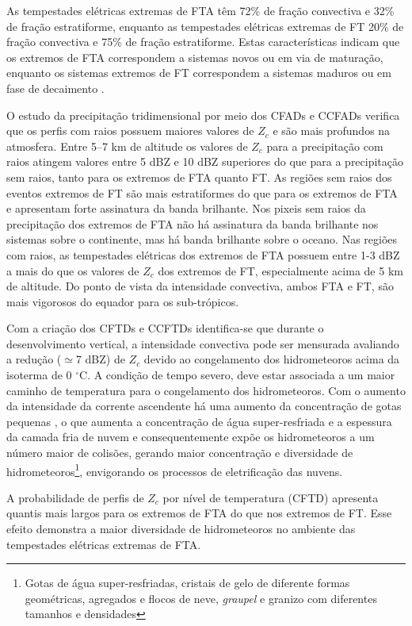 As tempestades elétricas extremas de FTA têm 72\% de fração convectiva e 32\% de fração estratiforme, enquanto as tempestades elétricas extremas de FT 20\% de fração convectiva e 75\% de fração estratiforme. Estas características indicam que os extremos de FTA correspondem a sistemas novos ou em via de maturação, enquanto os sistemas extremos de FT correspondem a sistemas maduros ou em fase de decaimento \cite{learyHouse1979}. 

O estudo da precipitação tridimensional por meio dos CFADs e CCFADs verifica que os perfis com raios possuem maiores valores de  $Z_c$ e são mais profundos na atmosfera. Entre 5--7 km de altitude os valores de $Z_c$ para a precipitação com raios atingem valores entre 5 dBZ e 10 dBZ superiores do que para a precipitação sem raios, tanto para os extremos de FTA quanto FT. As regiões sem raios dos eventos extremos de FT são mais estratiformes do que para os extremos de FTA e apresentam forte assinatura da banda brilhante. Nos pixeis sem raios da precipitação dos extremos de FTA não há assinatura da banda brilhante nos sistemas sobre o continente, mas há banda brilhante sobre o oceano. Nas regiões com raios, as tempestades elétricas dos extremos de FTA possuem entre 1-3 dBZ a mais do que os valores de $Z_c$ dos extremos de FT, especialmente acima de 5 km de altitude. Do ponto de vista da intensidade convectiva, ambos FTA e FT, são mais vigorosos do equador para os sub-trópicos. 


Com a criação dos CFTDs e CCFTDs identifica-se que durante o desenvolvimento vertical, a intensidade convectiva pode ser mensurada avaliando a redução ($\simeq$7 dBZ) de $Z_c$ devido ao congelamento dos hidrometeoros acima da isoterma de 0 $^{\circ}$C. A condição de tempo severo, deve estar associada a um maior caminho de temperatura para o congelamento dos hidrometeoros. Com o aumento da intensidade da corrente ascendente há uma aumento da  concentração de gotas pequenas \cite{bigg1953}, o que aumenta a concentração de água super-resfriada e a espessura da camada fria de nuvem e consequentemente expõe os hidrometeoros a um número maior de colisões, gerando maior concentração e diversidade de hidrometeoros\footnote{Gotas de água super-resfriadas, cristais de gelo de diferente formas geométricas, agregados e flocos de neve, \textit{graupel} e granizo com diferentes tamanhos e densidades}, envigorando os processos de eletrificação das nuvens.  

A probabilidade de perfis de $Z_c$ por nível de temperatura (CFTD) apresenta quantis mais largos para os extremos de FTA do que nos extremos de FT. Esse efeito demonstra a maior diversidade de hidrometeoros no ambiente das tempestades elétricas extremas de FTA.    

